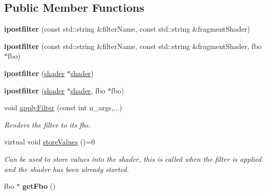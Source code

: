 \subsection*{Public Member Functions}
\begin{DoxyCompactItemize}
\item 
\mbox{\label{classflounder_1_1ipostfilter_adb158fccda942f9d05ec2c21ea3f8654}} 
{\bfseries ipostfilter} (const std\+::string \&filter\+Name, const std\+::string \&fragment\+Shader)
\item 
\mbox{\label{classflounder_1_1ipostfilter_a2c792b5d59c2b47b1f3b75a7a1404df0}} 
{\bfseries ipostfilter} (const std\+::string \&filter\+Name, const std\+::string \&fragment\+Shader, fbo $\ast$fbo)
\item 
\mbox{\label{classflounder_1_1ipostfilter_a90d67fde6f8fe6ff4e3a7dba0fab418d}} 
{\bfseries ipostfilter} (\hyperlink{classflounder_1_1shader}{shader} $\ast$\hyperlink{classflounder_1_1shader}{shader})
\item 
\mbox{\label{classflounder_1_1ipostfilter_a45622b81739ebad815b69526a878b054}} 
{\bfseries ipostfilter} (\hyperlink{classflounder_1_1shader}{shader} $\ast$\hyperlink{classflounder_1_1shader}{shader}, fbo $\ast$fbo)
\item 
void \hyperlink{classflounder_1_1ipostfilter_a34cced83864d9d6b1c664a0337cd97b2}{apply\+Filter} (const int n\+\_\+args,...)
\begin{DoxyCompactList}\small\item\em Renders the filter to its fbo. \end{DoxyCompactList}\item 
virtual void \hyperlink{classflounder_1_1ipostfilter_a9b658b4672718d5ac36539875bde722e}{store\+Values} ()=0
\begin{DoxyCompactList}\small\item\em Can be used to store values into the shader, this is called when the filter is applied and the shader has been already started. \end{DoxyCompactList}\item 
\mbox{\label{classflounder_1_1ipostfilter_a224c3773e02613bb410d3ed2ff29f5fc}} 
fbo $\ast$ {\bfseries get\+Fbo} ()
\end{DoxyCompactItemize}
